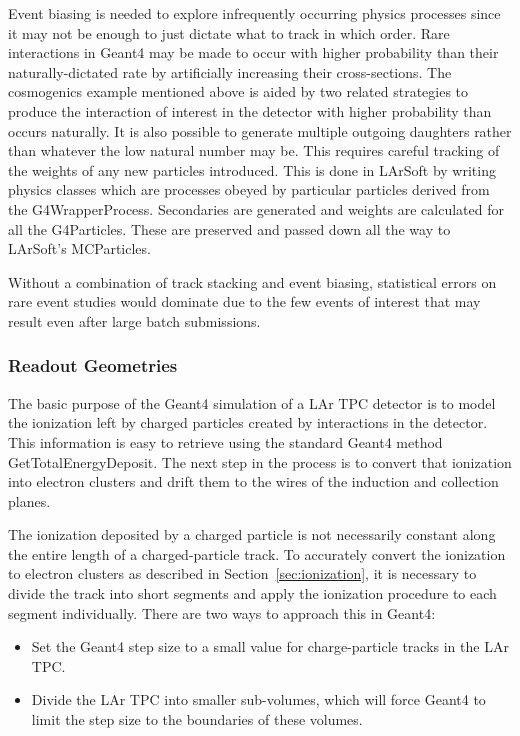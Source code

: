 \documentclass[12pt]{elsarticle}
\begin{document}
Event biasing is needed to explore infrequently occurring physics processes since it may
not be enough to just dictate what to track in which order. Rare interactions in Geant4 may be made to occur with higher 
probability than their naturally-dictated rate by artificially increasing their cross-sections. The cosmogenics example mentioned above is 
aided by two related strategies to produce the interaction of interest in the detector
with higher probability than occurs naturally. It is also possible to generate multiple outgoing daughters rather than whatever the low natural
number may be. This requires careful tracking of the weights of any new 
particles introduced. This is done in LArSoft by writing physics classes which are processes obeyed by particular particles derived from the G4WrapperProcess. Secondaries are generated 
and weights are calculated for all the G4Particles. These are preserved and passed down all the way to LArSoft's MCParticles.

Without a combination of track stacking and event biasing, statistical errors on rare event studies would dominate due to the few events of interest that may result even after large batch submissions.

\subsubsection{Readout Geometries}
\label{sec:detsim}

The basic purpose of the Geant4 simulation of a LAr TPC detector is to
model the ionization left by charged particles created by interactions
in the detector. This information is easy to retrieve using the
standard Geant4 method GetTotalEnergyDeposit. The next
step in the process is to convert that ionization into electron
clusters and drift them to the wires of the induction and collection
planes. 

The ionization deposited by a charged particle is not necessarily
constant along the entire length of a charged-particle track. To
accurately convert the ionization to electron clusters as described in
Section~\ref{sec:ionization}, it is necessary to divide the track into
short segments and apply the ionization procedure to each segment
individually. There are two ways to approach this in Geant4:

\begin{itemize}
\item Set the Geant4 step size to a small value for charge-particle tracks in the LAr TPC.
\item Divide the LAr TPC into smaller sub-volumes, which will force Geant4 to limit the step size to the boundaries of these volumes.
\end{itemize}
\end{document}
